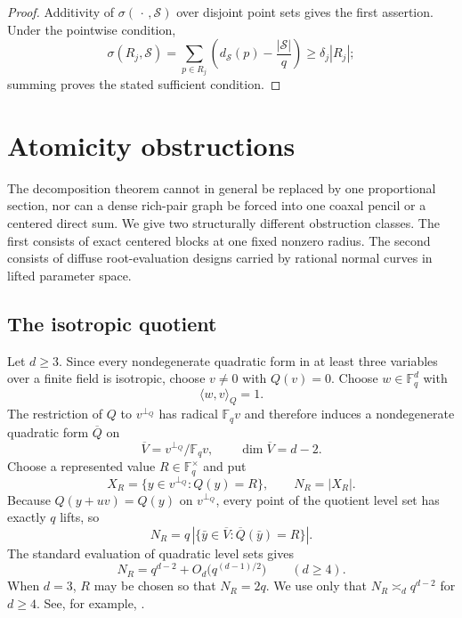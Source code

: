 \documentclass[11pt,letterpaper]{amsart}
\theoremstyle{definition}
\theoremstyle{remark}
\newcommand{\1}{\mathbf 1}
\newcommand{\ip}[2]{\langle #1,#2\rangle_Q}
\begin{document}
\begin{proof}
Additivity of $\sigma(\,\cdot\,,\mathcal S)$ over disjoint point sets gives the first assertion.  Under the pointwise condition,
\[
 \sigma(R_j,\mathcal S)
 =\sum_{p\in R_j}\left(d_{\mathcal S}(p)-\frac{|\mathcal S|}{q}\right)
 \ge\delta_j|R_j|;
\]
summing proves the stated sufficient condition.
\end{proof}

\section{Atomicity obstructions}\label{sec:atomicity}

The decomposition theorem cannot in general be replaced by one proportional section, nor can a dense rich-pair graph be forced into one coaxal pencil or a centered direct sum.  We give two structurally different obstruction classes.  The first consists of exact centered blocks at one fixed nonzero radius.  The second consists of diffuse root-evaluation designs carried by rational normal curves in lifted parameter space.

\subsection{The isotropic quotient}

Let $d\ge3$.  Since every nondegenerate quadratic form in at least three variables over a finite field is isotropic, choose $v\ne0$ with $Q(v)=0$.  Choose $w\in\mathbb F_q^d$ with
\[
 \ip{w}{v}=1.
\]
The restriction of $Q$ to $v^{\perp_Q}$ has radical $\mathbb F_q v$ and therefore induces a nondegenerate quadratic form $\overline Q$ on
\[
 \overline V=v^{\perp_Q}/\mathbb F_q v,
 \qquad \dim\overline V=d-2.
\]
Choose a represented value $R\in\mathbb F_q^\times$ and put
\begin{equation}\label{eq:NR-def}
 X_R=\{y\in v^{\perp_Q}:Q(y)=R\},
 \qquad N_R=|X_R|.
\end{equation}
Because $Q(y+uv)=Q(y)$ on $v^{\perp_Q}$, every point of the quotient level set has exactly $q$ lifts, so
\begin{equation}\label{eq:NR-quotient}
 N_R=q\,|\{\bar y\in\overline V:\overline Q(\bar y)=R\}|.
\end{equation}
The standard evaluation of quadratic level sets gives
\begin{equation}\label{eq:NR-asymptotic}
 N_R=q^{d-2}+O_d\bigl(q^{(d-1)/2}\bigr)
 \qquad(d\ge4).
\end{equation}
When $d=3$, $R$ may be chosen so that $N_R=2q$.  We use only that $N_R\asymp_d q^{d-2}$ for $d\ge4$.  See, for example, \cite[Chapter~6]{LN}.
\end{document}
